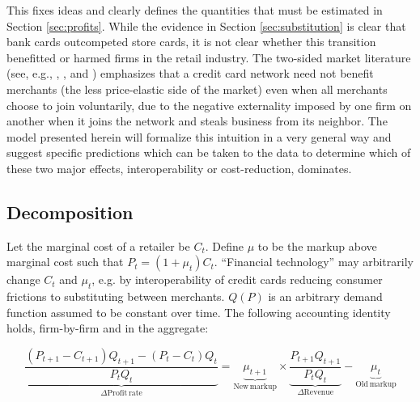 \documentclass[12pt,english]{article}
\begin{document}
This fixes ideas and clearly defines the quantities that must be estimated in Section \ref{sec:profits}. While the evidence in Section \ref{sec:substitution} is clear that bank cards outcompeted store cards, it is not clear whether this transition benefitted or harmed firms in the retail industry. The two-sided market literature (see, e.g., \cite{rochet_platform_2003}, \cite{bourguignon_card_2014}, and \cite{wang_regulating_2023}) emphasizes that a credit card network need not benefit merchants (the less price-elastic side of the market) even when all merchants choose to join voluntarily, due to the negative externality imposed by one firm on another when it joins the network and steals business from its neighbor. The model presented herein will formalize this intuition in a very general way and suggest specific predictions which can be taken to the data to determine which of these two major effects, interoperability or cost-reduction, dominates. 

\subsection{Decomposition}

Let the marginal cost of a retailer be $C_t$. Define $\mu$ to be the markup above marginal cost such that $P_t = \left(1+\mu_t\right)C_t$. ``Financial technology'' may arbitrarily change $C_t$ and $\mu_t$, e.g. by interoperability of credit cards reducing consumer frictions to substituting between merchants. $Q(P)$ is an arbitrary demand function assumed to be constant over time. The following accounting identity holds, firm-by-firm and in the aggregate: 

\begin{equation}\label{eq:decomposition}
    \underbrace{\frac{\left(P_{t+1}-C_{t+1}\right)Q_{t+1} - \left(P_{t}-C_{t}\right)Q_{t}}{P_t Q_t}}_{\Delta\mathrm{Profit\,rate}} = \underbrace{\mu_{t+1}}_{\mathrm{New\,markup}} \times \underbrace{\frac{P_{t+1} Q_{t+1}}{P_t Q_t}}_{\Delta \mathrm{Revenue}} - \underbrace{\mu_t}_\mathrm{Old\,markup}   
\end{equation}
\end{document}
